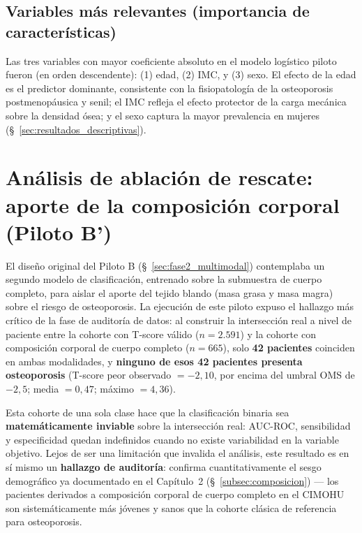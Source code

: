 \documentclass[../tesis.tex]{subfiles}
\begin{document}
\subsection{Variables más relevantes (importancia de características)}

Las tres variables con mayor coeficiente absoluto en el modelo logístico piloto fueron (en orden descendente): (1) edad, (2) IMC, y (3) sexo. El efecto de la edad es el predictor dominante, consistente con la fisiopatología de la osteoporosis postmenopáusica y senil; el IMC refleja el efecto protector de la carga mecánica sobre la densidad ósea; y el sexo captura la mayor prevalencia en mujeres (§~\ref{sec:resultados_descriptivas}).

\section{Análisis de ablación de rescate: aporte de la composición corporal (Piloto B')}
\label{sec:resultados_pilotob}

El diseño original del Piloto B (§~\ref{sec:fase2_multimodal}) contemplaba un segundo modelo de clasificación, entrenado sobre la submuestra de cuerpo completo, para aislar el aporte del tejido blando (masa grasa y masa magra) sobre el riesgo de osteoporosis. La ejecución de este piloto expuso el hallazgo más crítico de la fase de auditoría de datos: al construir la intersección real a nivel de paciente entre la cohorte con T-score válido ($n = 2.591$) y la cohorte con composición corporal de cuerpo completo ($n = 665$), solo \textbf{42 pacientes} coinciden en ambas modalidades, y \textbf{ninguno de esos 42 pacientes presenta osteoporosis} (T-score peor observado $= -2{,}10$, por encima del umbral OMS de $-2{,}5$; media $= 0{,}47$; máximo $= 4{,}36$).

Esta cohorte de una sola clase hace que la clasificación binaria sea \textbf{matemáticamente inviable} sobre la intersección real: AUC-ROC, sensibilidad y especificidad quedan indefinidos cuando no existe variabilidad en la variable objetivo. Lejos de ser una limitación que invalida el análisis, este resultado es en sí mismo un \textbf{hallazgo de auditoría}: confirma cuantitativamente el sesgo demográfico ya documentado en el Capítulo~2 (§~\ref{subsec:composicion}) --- los pacientes derivados a composición corporal de cuerpo completo en el CIMOHU son sistemáticamente más jóvenes y sanos que la cohorte clásica de referencia para osteoporosis.
\end{document}
